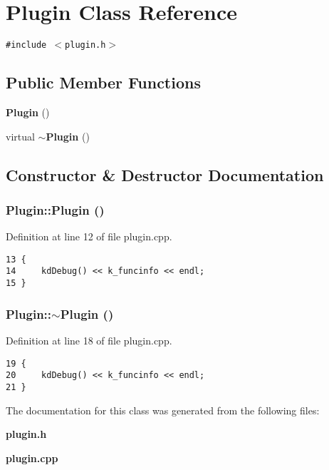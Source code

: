 \section{Plugin Class Reference}
\label{classPlugin}
{\tt \#include $<$plugin.h$>$}

\subsection*{Public Member Functions}
\begin{CompactItemize}
\item 
{\bf Plugin} ()
\item 
virtual {\bf $\sim$Plugin} ()
\end{CompactItemize}


\subsection{Constructor \& Destructor Documentation}
\subsubsection{\setlength{\rightskip}{0pt plus 5cm}Plugin::Plugin ()}\label{classPlugin_Plugina0}




Definition at line 12 of file plugin.cpp.



\footnotesize\begin{verbatim}13 {
14     kdDebug() << k_funcinfo << endl;
15 }
\end{verbatim}\normalsize 
{}
\subsubsection{\setlength{\rightskip}{0pt plus 5cm}Plugin::$\sim${\bf Plugin} ()\hspace{0.3cm}{\tt  [virtual]}}\label{classPlugin_Plugina1}




Definition at line 18 of file plugin.cpp.



\footnotesize\begin{verbatim}19 {
20     kdDebug() << k_funcinfo << endl;
21 }
\end{verbatim}\normalsize 


The documentation for this class was generated from the following files:\begin{CompactItemize}
\item 
{\bf plugin.h}\item 
{\bf plugin.cpp}\end{CompactItemize}
